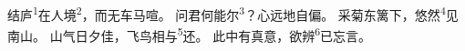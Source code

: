 
\begin{poem}
结庐\textsuperscript{1}在人境\textsuperscript{2}，而无车马喧。
问君何能尔\textsuperscript{3}？心远地自偏。
采菊东篱下，悠然\textsuperscript{4}见南山。
山气日夕佳，飞鸟相与\textsuperscript{5}还。
此中有真意，欲辨\textsuperscript{6}已忘言。
\end{poem}

\begin{annotations}
\end{annotations}

